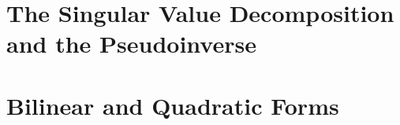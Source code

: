 \setcounter{section}{6}
\section{The Singular Value Decomposition and the Pseudoinverse}



\vspace{12pt}



\vspace{12pt}



\vspace{12pt}



\vspace{12pt}

\setcounter{Exercise}{5}


\section{Bilinear and Quadratic Forms}

\setcounter{Exercise}{2}






